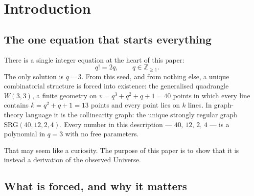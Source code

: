 
\section*{Introduction}
\label{sec:intro}

\subsection*{The one equation that starts everything}

There is a single integer equation at the heart of this paper:
\begin{equation}
  q! = 2q, \qquad q \in \mathbb{Z}_{\ge 1}.
  \label{eq:seed}
\end{equation}
The only solution is $q = 3$.  From this seed, and from nothing else,
a unique combinatorial structure is forced into existence:
the generalised quadrangle $W(3,3)$, a finite geometry on
$v = q^3+q^2+q+1 = 40$ points in which every line contains $k = q^2+q+1 = 13$
points and every point lies on $k$ lines.  In graph-theory language it is the
collinearity graph: the unique strongly regular graph
$\mathrm{SRG}(40,12,2,4)$.  Every number in this description --- $40$, $12$, $2$,
$4$ --- is a polynomial in $q = 3$ with no free parameters.

That may seem like a curiosity.  The purpose of this paper is to show
that it is instead a derivation of the observed Universe.

\subsection*{What is forced, and why it matters}

